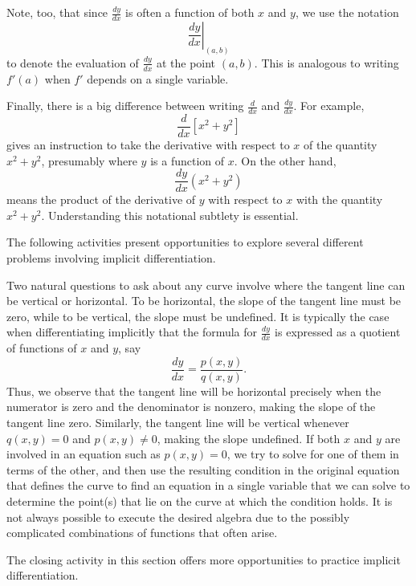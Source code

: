 Note, too, that since $\frac{dy}{dx}$ is often a function of both $x$ and $y$, we use the notation 
$$ \left. \frac{dy}{dx} \right|_{(a,b)}$$
to denote the evaluation of $\frac{dy}{dx}$ at the point $(a,b)$.  This is analogous to writing $f'(a)$ when $f'$ depends on a single variable.

Finally, there is a big difference between writing $\frac{d}{dx}$ and $\frac{dy}{dx}$.  For example,
$$\frac{d}{dx}[x^2 + y^2]$$
gives an instruction to take the derivative with respect to $x$ of the quantity $x^2 + y^2$, presumably where $y$ is a function of $x$.  On the other hand,
$$\frac{dy}{dx}(x^2 + y^2)$$
means the product of the derivative of $y$ with respect to $x$ with the quantity $x^2 + y^2$.  Understanding this notational subtlety is essential.

The following activities present opportunities to explore several different problems involving implicit differentiation.



Two natural questions to ask about any curve involve where the tangent line can be vertical or horizontal.  To be horizontal, the slope of the tangent line must be zero, while to be vertical, the slope must be undefined.  It is typically the case when differentiating implicitly that the formula for $\frac{dy}{dx}$ is expressed as a quotient of functions of $x$ and $y$, say
$$\frac{dy}{dx} = \frac{p(x,y)}{q(x,y)}.$$  
Thus, we observe that the tangent line will be horizontal precisely when the numerator is zero and the denominator is nonzero, making the slope of the tangent line zero.  Similarly, the tangent line will be vertical whenever $q(x,y) = 0$ and $p(x,y) \ne 0$, making the slope undefined.  If both $x$ and $y$ are involved in an equation such as $p(x,y) = 0$, we try to solve for one of them in terms of the other, and then use the resulting condition in the original equation that defines the curve to find an equation in a single variable that we can solve to determine the point(s) that lie on the curve at which the condition holds.  It is not always possible to execute the desired algebra due to the possibly complicated combinations of functions that often arise.  




The closing activity in this section offers more opportunities to practice implicit differentiation.



